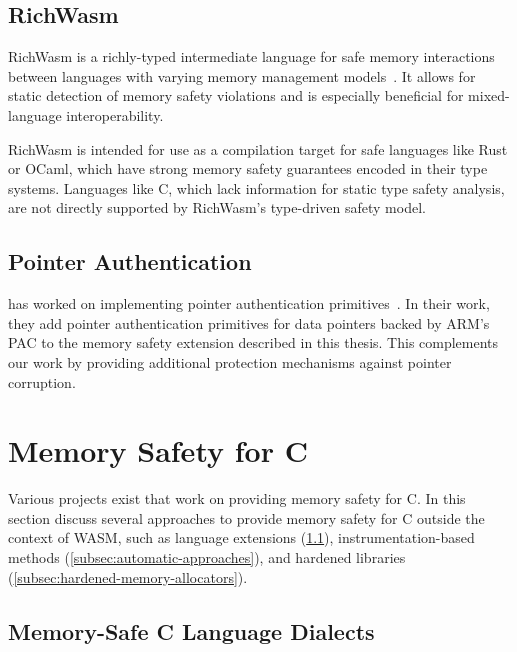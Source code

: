\subsection{RichWasm}
\label{subsec:richwasm}

RichWasm is a richly-typed intermediate language for safe memory interactions between languages with varying memory management models~\cite{paraskevopoulou2024richwasm}.
It allows for static detection of memory safety violations and is especially beneficial for mixed-language interoperability.

RichWasm is intended for use as a compilation target for safe languages like Rust or OCaml, which have strong memory safety guarantees encoded in their type systems.
Languages like C, which lack information for static type safety analysis, are not directly supported by RichWasm's type-driven safety model.

\subsection{Pointer Authentication}
\label{subsec:related-pointer-authentication}

\citeauthor*{rehde2023wasm} has worked on implementing pointer authentication primitives~\cite{rehde2023wasm}.
In their work, they add pointer authentication primitives for data pointers backed by ARM's \ac{PAC} to the memory safety extension described in this thesis.
This complements our work by providing additional protection mechanisms against pointer corruption.

\section{Memory Safety for C}
\label{sec:related-memory-safety}

Various projects exist that work on providing memory safety for C.
In this section discuss several approaches to provide memory safety for C outside the context of \ac{WASM}, such as language extensions (\cref{subsec:extensions-to-the-c-language}), instrumentation-based methods (\cref{subsec:automatic-approaches}), and hardened libraries (\cref{subsec:hardened-memory-allocators}).

\subsection{Memory-Safe C Language Dialects}
\label{subsec:extensions-to-the-c-language}


